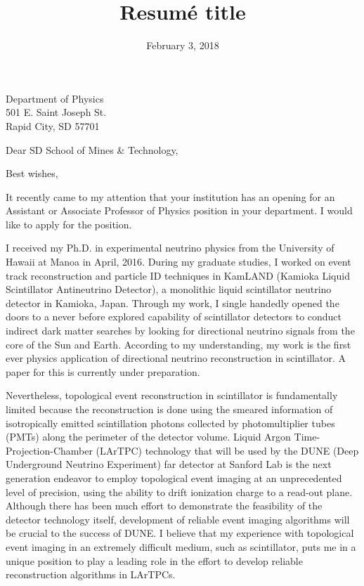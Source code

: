 \documentclass[10pt,a4paper,sans]{moderncv}        %
\title{Resumé title}                               %
\begin{document}
{Department of Physics\\
501 E. Saint Joseph St.\\
Rapid City, SD 57701}
\date{February 3, 2018}
\opening{Dear SD School of Mines \& Technology,}
\closing{Best wishes,}
\makelettertitle

It recently came to my attention that your institution has an opening for an
Assistant or Associate Professor of Physics position in your department. I
would like to apply for the position.

I received my Ph.D. in experimental neutrino physics from the University of
Hawaii at Manoa in April, 2016. During my graduate studies, I worked on event
track reconstruction and particle ID techniques in KamLAND (Kamioka Liquid
Scintillator Antineutrino Detector), a monolithic liquid scintillator neutrino
detector in Kamioka, Japan. Through my work, I single handedly opened the doors
to a never before explored capability of scintillator detectors to conduct
indirect dark matter searches by looking for directional neutrino signals from
the core of the Sun and Earth. According to my understanding, my work is the
first ever physics application of directional neutrino reconstruction in
scintillator. A paper for this is currently under preparation.

Nevertheless, topological event reconstruction in scintillator is fundamentally
limited because the reconstruction is done using the smeared information of
isotropically emitted scintillation photons collected by photomultiplier tubes
(PMTs) along the perimeter of the detector volume. Liquid Argon
Time-Projection-Chamber (LArTPC) technology that will be used by the DUNE (Deep
Underground Neutrino Experiment) far detector at Sanford Lab is the next
generation endeavor to employ topological event imaging at an unprecedented
level of precision, using the ability to drift ionization charge to a read-out
plane. Although there has been much effort to demonstrate the feasibility of
the detector technology itself, development of reliable event imaging
algorithms will be crucial to the success of DUNE. I believe that my experience
with topological event imaging in an extremely difficult medium, such as
scintillator, puts me in a unique position to play a leading role in the effort
to develop reliable reconstruction algorithms in LArTPCs.
\end{document}
